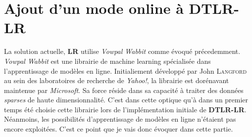 \section{Ajout d'un mode online à DTLR-LR}
    La solution actuelle, \textbf{LR} utilise \emph{Vowpal Wabbit} comme évoqué précedemment. \emph{Vowpal Wabbit} est une librairie de machine learning spécialisée dans l'apprentissage de modèles en ligne. Initialiement développé par John \textsc{Langford} au sein des laboratoires de recherche de \emph{Yahoo!}, la librairie est dorénavant maintenue par \emph{Microsoft}. Sa force réside dans sa capacité à traiter des données \emph{sparses} de haute dimensionnalité. C'est dans cette optique qu'à dans un premier temps été choisie cette librairie lors de l'implémentation initiale de \textbf{DTLR-LR}. Néanmoins, les possibilités d'apprentissage de modèles en ligne n'étaient pas encore exploitées. C'est ce point que je vais donc évoquer dans cette partie. 
